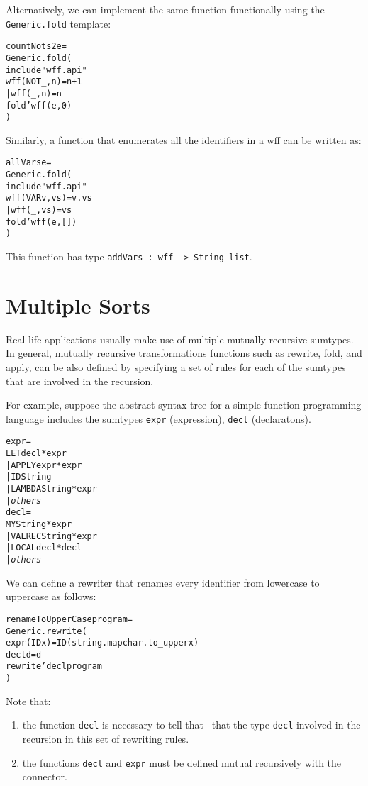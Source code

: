 Alternatively, we can implement the same function 
functionally using the \verb|Generic.fold| template:
\begin{alltt}
   \FUN countNots2 e = 
       Generic.fold(
       \LET include "wff.api"
           \FUN wff (NOT _, n) = n+1
             | wff (_, n) = n
       \IN  fold'wff(e, 0)
       \END)
\end{alltt}

Similarly, a function that enumerates all the identifiers in a wff
can be written as:
\begin{alltt}
   \FUN allVars e = 
       Generic.fold(
       \LET include "wff.api"
           \FUN wff (VAR v, vs) = v . vs
             | wff (_, vs) = vs
       \IN  fold'wff(e, [])
       \END)
\end{alltt}
This function has type \verb|addVars : wff -> String list|.

\section{Multiple Sorts}

   Real life applications usually make use of multiple
mutually recursive sumtypes.  In general, mutually recursive
transformations functions such as rewrite, fold, and apply, can be also defined  
by specifying a set of rules for each of the sumtypes that are involved
in the recursion.  

   For example, suppose the abstract syntax tree  
for a simple function programming language includes 
the sumtypes \verb|expr| (expression), 
\verb|decl| (declaratons).

\begin{alltt}
  \SUMTYPE expr = 
    LET \OF decl * expr
  | APPLY \OF expr * expr
  | ID \OF String
  | LAMBDA \OF String * expr
  | {\em others}
  \AND decl = 
    MY \OF String * expr
  | VALREC \OF String * expr
  | LOCAL \OF decl * decl
  | {\em others}
\end{alltt}

We can define a rewriter that renames every identifier 
from lowercase to uppercase as follows:
\begin{alltt}
   \FUN renameToUpperCase program =  
   Generic.rewrite(
        \FUN expr (ID x) = ID(string.map char.to_upper x)
        \AND decl d      = d
   \IN  rewrite'decl program
   \END
   )
\end{alltt}

Note that:
\begin{enumerate}
  \item the function \verb|decl| is necessary to tell that 
\RewriteGen\ that the type \verb|decl| involved in the recursion
in this set of rewriting rules.
  \item the functions \verb|decl| and \verb|expr| must be defined 
        mutual recursively with the \AND{} connector.
\end{enumerate}

